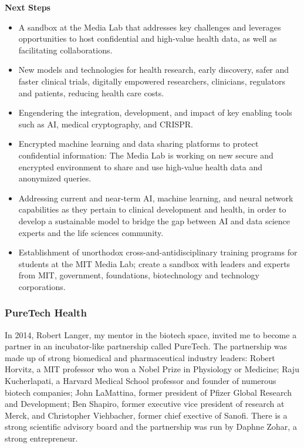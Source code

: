 \textbf{Next Steps}
\begin{itemize}

\item{A sandbox at the Media Lab that addresses key challenges and leverages opportunities to host confidential and high-value health data, as well as facilitating collaborations.}

\item{New models and technologies for health research, early discovery, safer and faster clinical trials, digitally empowered researchers, clinicians, regulators and patients, reducing health care costs.}

\item{Engendering the integration, development, and impact of key enabling tools such as \ac{AI}, medical cryptography, and CRISPR.}

\item{Encrypted machine learning and data sharing platforms to protect confidential information: The Media Lab is working on new secure and encrypted environment to share and use high-value health data and anonymized queries.}

\item{Addressing current and near-term \ac{AI}, machine learning, and neural network capabilities as they pertain to clinical development and health, in order to develop a sustainable model to bridge the gap between \ac{AI} and data science experts and the life sciences community.}

\item{Establishment of unorthodox cross-and-antidisciplinary training programs for students at the MIT Media Lab; create a sandbox with leaders and experts from MIT, government, foundations, biotechnology and technology corporations.}

\end{itemize}

\subsubsection{PureTech Health}

In 2014, Robert Langer, my mentor in the biotech space, invited me to become a partner in an incubator-like partnership called PureTech. The partnership was made up of strong biomedical and pharmaceutical industry leaders: Robert Horvitz, a MIT professor who won a Nobel Prize in Physiology or Medicine; Raju Kucherlapati, a Harvard Medical School professor and founder of numerous biotech companies; John LaMattina, former president of Pfizer Global Research and Development; Ben Shapiro, former executive vice president of research at Merck, and Christopher Viehbacher, former chief exective of Sanofi. There is a strong scientific advisory board and the partnership was run by Daphne Zohar, a strong entrepreneur.

